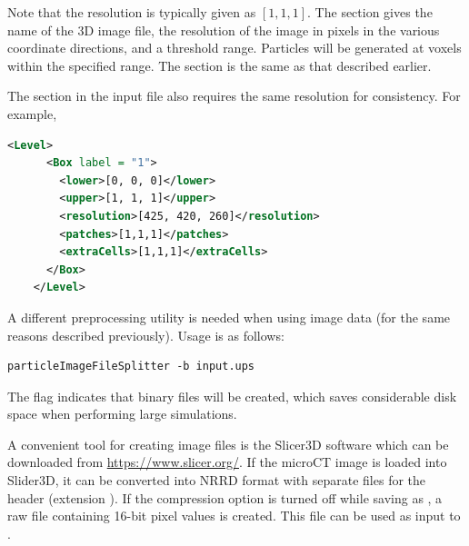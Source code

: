   Note that the  resolution is typically given as $[1,1,1]$. 
  The  section gives the name of the 3D image file, 
  the resolution of the image in pixels in the various coordinate directions, and 
  a threshold range.  Particles will be generated at voxels within the specified range.  
  The  section is the same as that described earlier.  

  The  section in the input file also requires the same resolution for
  consistency.  For example, 
  \begin{lstlisting}[language=XML]
    <Level>
      <Box label = "1">
        <lower>[0, 0, 0]</lower>
        <upper>[1, 1, 1]</upper>
        <resolution>[425, 420, 260]</resolution>
        <patches>[1,1,1]</patches>
        <extraCells>[1,1,1]</extraCells>
      </Box>
    </Level>
  \end{lstlisting}

  A different preprocessing utility is needed when using image data (for the same reasons 
  described previously).  Usage is as follows:
  \begin{lstlisting}[backgroundcolor=\color{background}]
     particleImageFileSplitter -b input.ups
  \end{lstlisting}
  The  flag indicates that binary  files will be created, which
  saves considerable disk space when performing large simulations.

  \begin{NoteBox}
   A convenient tool for creating  image files is the Slicer3D software
   which can be downloaded from \url{https://www.slicer.org/}.  If the microCT image
   is loaded into Slider3D, it can be converted into NRRD format with separate files
   for the header (extension ).  If the compression option is turned off
   while saving as , a raw file containing 16-bit pixel values is created.
   This file can be used as input to \Vaango.
  \end{NoteBox}

